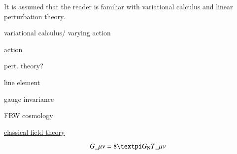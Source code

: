 



It is assumed that the reader is familiar with variational calculus and linear perturbation theory.






\begin{bullets}
    \item variational calculus/ varying action
    \item action
    \item pert. theory?
    \item line element
    \item gauge invariance
    \item FRW cosmology
    \item \underline{classical field theory}
\end{bullets}



\begin{equation}
    G\_{\mu\nu} = 8\ppi G\ped{N} T\_{\mu\nu}
\end{equation}

